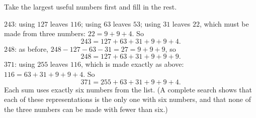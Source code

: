 Take the largest useful numbers first and fill in the rest.

$243$: using $127$ leaves $116$; using $63$ leaves $53$; using $31$ leaves $22$, which must be made from three numbers: $22=9+9+4$. So
\[
243=127+63+31+9+9+4 .
\]
$248$: as before, $248-127-63-31=27=9+9+9$, so
\[
248=127+63+31+9+9+9 .
\]
$371$: using $255$ leaves $116$, which is made exactly as above: $116=63+31+9+9+4$. So
\[
371=255+63+31+9+9+4 .
\]
Each sum uses exactly six numbers from the list. (A complete search shows that each of these representations is the only one with six numbers, and that none of the three numbers can be made with fewer than six.)
